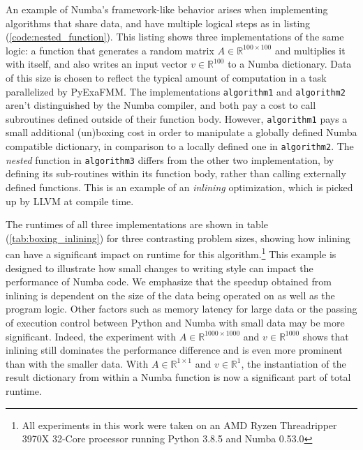 \documentclass{IEEEcsmag}
\begin{document}
An example of Numba's framework-like behavior arises when implementing algorithms that share data, and have multiple logical steps as in listing (\ref{code:nested_function}). This listing shows three implementations of the same logic: a function that generates a random matrix $A \in \mathbb{R}^{100 \times 100}$ and multiplies it with itself, and also writes an input vector $v \in \mathbb{R}^{100}$ to a Numba dictionary. Data of this size is chosen to reflect the typical amount of computation in a task parallelized by PyExaFMM. The implementations \lstinline{algorithm1} and \lstinline{algorithm2} aren't distinguished by the Numba compiler, and both pay a cost to call subroutines defined outside of their function body. However, \lstinline{algorithm1} pays a small additional (un)boxing cost in order to manipulate a globally defined Numba compatible dictionary, in comparison to a locally defined one in \lstinline{algorithm2}. The \textit{nested} function in \lstinline{algorithm3} differs from the other two implementation, by defining its sub-routines within its function body, rather than calling externally defined functions. This is an example of an \textit{inlining} optimization, which is picked up by LLVM at compile time.

The runtimes of all three implementations are shown in table (\ref{tab:boxing_inlining}) for three contrasting problem sizes, showing how inlining can have a significant impact on runtime for this algorithm.\footnote{All experiments in this work were taken on an AMD Ryzen Threadripper 3970X 32-Core processor running Python 3.8.5 and Numba 0.53.0} This example is designed to illustrate how small changes to writing style can impact the performance of Numba code. We emphasize that the speedup obtained from inlining is dependent on the size of the data being operated on as well as the program logic. Other factors such as memory latency for large data or the passing of execution control between Python and Numba with small data may be more significant. Indeed, the experiment with $A \in \mathbb{R}^{1000 \times 1000}$ and $v \in \mathbb{R}^{1000}$ shows that inlining still dominates the performance difference and is even more prominent than with the smaller data. With $A \in \mathbb{R}^{1 \times 1}$ and $v \in \mathbb{R}^1$, the instantiation of the result dictionary from within a Numba function is now a significant part of total runtime.
\end{document}
